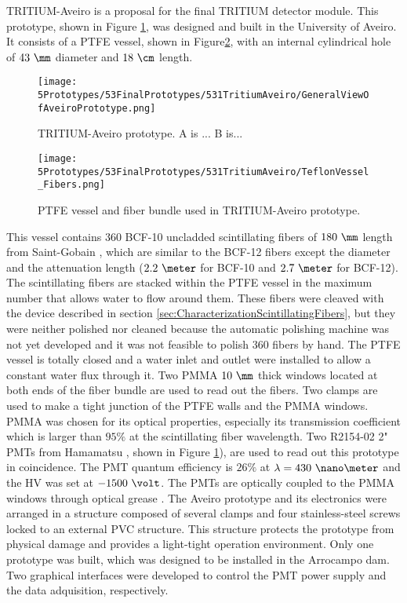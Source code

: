 TRITIUM-Aveiro is a proposal for the final TRITIUM detector module. This prototype, shown in Figure \ref{fig:TritiumAveiro0}, was designed and built in the University of Aveiro. It consists of a PTFE vessel, shown in Figure\ref{fig:TeflonStructureFibersTritiumAveiro0}, with an internal cylindrical hole of $43~\mm$ diameter and $18~\cm$ length.
\begin{figure}[h]
\centering
\texttt{[image: 5Prototypes/53FinalPrototypes/531TritiumAveiro/GeneralViewOfAveiroPrototype.png]}
\caption{TRITIUM-Aveiro prototype. A is ... B is...\label{fig:TritiumAveiro0}}
\end{figure}
\begin{figure}[h]
\centering
\texttt{[image: 5Prototypes/53FinalPrototypes/531TritiumAveiro/TeflonVessel\_Fibers.png]}
\caption{PTFE vessel and fiber bundle used in TRITIUM-Aveiro prototype.  \label{fig:TeflonStructureFibersTritiumAveiro0}}
\end{figure}
This vessel contains $360$ BCF-10 uncladded scintillating fibers of $180~\mm$ length from Saint-Gobain \cite{DataSheetBCF12Fiber}, which are similar to the BCF-12 fibers except the diameter and the attenuation length ($2.2~\meter$ for BCF-10 and $2.7~\meter$ for BCF-12). The scintillating fibers are stacked within the PTFE vessel in the maximum number that allows water to flow around them. These fibers were cleaved with the device described in section \ref{sec:CharacterizationScintillatingFibers}, but they were neither polished nor cleaned because the automatic polishing machine was not yet developed and it was not feasible to polish 360 fibers by hand. The PTFE vessel is totally closed and a water inlet and outlet were installed to allow a constant water flux through it. Two PMMA $10~\mm$ thick windows located at both ends of the fiber bundle are used to read out the fibers. Two clamps are used to make a tight junction of the PTFE walls and the PMMA windows. PMMA was chosen for its optical properties, especially its transmission coefficient which is larger than $95\%$ at the scintillating fiber wavelength. Two R2154-02 2" PMTs from Hamamatsu \cite{DataSheetPMTsAveiro}, shown in Figure \ref{fig:TritiumAveiro0}), are used to read out this prototype in coincidence. The PMT quantum efficiency is $26\%$ at $\lambda=430~\nano\meter$ and the HV was set at $-1500~\volt$. The PMTs are optically coupled to the PMMA windows through optical grease \cite{OpticalGrease}. The Aveiro prototype and its electronics were arranged in a structure composed of several clamps and four stainless-steel screws locked to an external PVC structure. This structure protects the prototype from physical damage and provides a light-tight operation environment. Only one prototype was built, which was designed to be installed in the Arrocampo dam. Two graphical interfaces were developed to control the PMT power supply and the data adquisition, respectively. 

